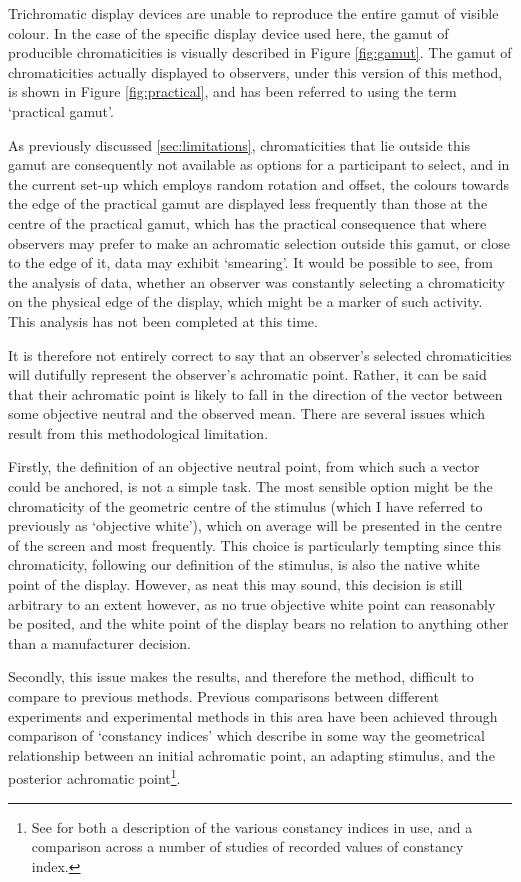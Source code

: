 Trichromatic display devices are unable to reproduce the entire gamut of visible colour. In the case of the specific display device used here, the gamut of producible chromaticities is visually described in Figure \ref{fig:gamut}. The gamut of chromaticities actually displayed to observers, under this version of this method, is shown in Figure \ref{fig:practical}, and has been referred to using the term `practical gamut'.

As previously discussed \ref{sec:limitations}, chromaticities that lie outside this gamut are consequently not available as options for a participant to select, and in the current set-up which employs random rotation and offset, the colours towards the edge of the practical gamut are displayed less frequently than those at the centre of the practical gamut, which has the practical consequence that where observers may prefer to make an achromatic selection outside this gamut, or close to the edge of it, data may exhibit `smearing'. It would be possible to see, from the analysis of data, whether an observer was constantly selecting a chromaticity on the physical edge of the display, which might be a marker of such activity. This analysis has not been completed at this time.

It is therefore not entirely correct to say that an observer's selected chromaticities will dutifully represent the observer's achromatic point. Rather, it can be said that their achromatic point is likely to fall in the direction of the vector between some objective neutral and the observed mean. There are several issues which result from this methodological limitation.

Firstly, the definition of an objective neutral point, from which such a vector could be anchored, is not a simple task. The most sensible option might be the chromaticity of the geometric centre of the stimulus (which I have referred to previously as `objective white'), which on average will be presented in the centre of the screen and most frequently. This choice is particularly tempting since this chromaticity, following our definition of the stimulus, is also the native white point of the display. However, as neat this may sound, this decision is still arbitrary to an extent however, as no true objective white point can reasonably be posited, and the white point of the display bears no relation to anything other than a manufacturer decision. 

Secondly, this issue makes the results, and therefore the method, difficult to compare to previous methods. Previous comparisons between different experiments and experimental methods in this area have been achieved through comparison of `constancy indices' which describe in some way the geometrical relationship between an initial achromatic point, an adapting stimulus, and the posterior achromatic point\footnote{See \citet{foster_color_2011} for both a description of the various constancy indices in use, and a comparison across a number of studies of recorded values of constancy index.}. 

